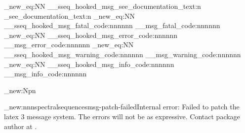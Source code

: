 \def\SseqErrorToWarning#1{\msg_redirect_name:nnn{spectralsequences}{#1}{warning}}
\let\sseqerrortowarning\SseqErrorToWarning
\def\sseq@quieterror#1{\msg_redirect_name:nnn{spectralsequences}{#1}{none}}

\def\sseq@error     {\msg_error:nn    {spectralsequences}}
\def\sseq@error@n   {\msg_error:nnn   {spectralsequences}}
\def\sseq@error@nn  {\msg_error:nnnn  {spectralsequences}}
\def\sseq@error@nnn {\msg_error:nnnnn {spectralsequences}}
\def\sseq@error@nnnn{\msg_error:nnnnnn{spectralsequences}}
\def\sseq@error@x   {\msg_error:nnx   {spectralsequences}}
\def\sseq@error@xx  {\msg_error:nnxx  {spectralsequences}}
\def\sseq@error@xxx {\msg_error:nnxxx {spectralsequences}}
\def\sseq@error@xxxx{\msg_error:nnxxxx{spectralsequences}}
\def\sseq@warning   {\msg_warning:nn{spectralsequences}}

\def\sseq@newerror#1#2{\msg_new:nnn{spectralsequences}{#1}{#2}}
\def\sseq@newerror@internal#1#2{\msg_new:nnn{spectralsequences}{#1}{Internal error: #2 \sseq@contactpackageauthor}}
\edef\sseq@contactpackageauthor{Contact package author \sseq@authorname\space at \sseq@authoremail.}


\cs_new_eq:NN \__sseq_hooked_msg_see_documentation_text:n \msg_see_documentation_text:n
\cs_new_eq:NN \__sseq_hooked_msg_fatal_code:nnnnnn   \__msg_fatal_code:nnnnnn
\cs_new_eq:NN \__sseq_hooked_msg_error_code:nnnnnn   \__msg_error_code:nnnnnn
\cs_new_eq:NN \__sseq_hooked_msg_warning_code:nnnnnn \__msg_warning_code:nnnnnn
\cs_new_eq:NN \__sseq_hooked_msg_info_code:nnnnnn    \__msg_info_code:nnnnnn


\cs_new:Npn 

\sseq@newerror@internal{msg-patch-failed}{Failed to patch the latex 3 message system. The errors will not be as expressive.}

\def\sseq@msgpatchfailed{
    \msg_error:nn{spectralsequences}{msg-patch-failed}
    \def\sseq@installmsghooks{}
    \sseq@break
}

\let\sseq@errmessage@std\errmessage
\def\sseq@errmessage#1{\sseq@error@setup\let\\\iow_newline:\sseq@errmessage@std{#1\sseq@error@annotation}\sseq@error@cleanup}

